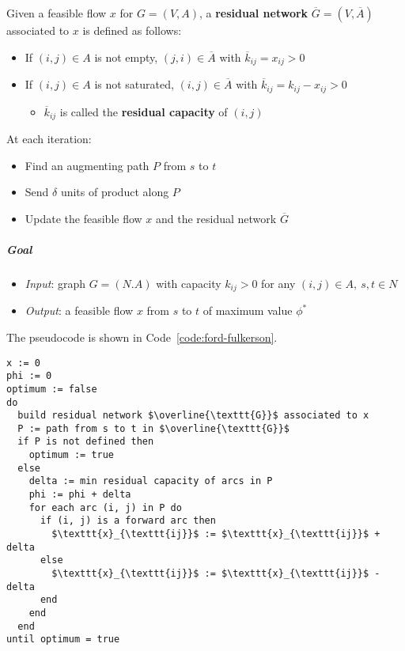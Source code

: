 \documentclass[english]{article}
\begin{document}
\bigskip
Given a feasible flow \(x\) for \(G = (V, A)\), a \textbf{residual network} \(\overline{G} = \left(V, \overline{A}\right)\) associated to \(x\) is defined as follows:

\begin{itemize}
  \item If \(\left( i, j \right) \in A\) is not empty, \(\left( j, i \right) \in \overline{A}\) with \(\overline{k}_{ij} = x_{ij} > 0\)
  \item If \(\left( i, j \right) \in A\) is not saturated, \(\left( i, j \right) \in \overline{A}\) with \(\overline{k}_{ij} = k_{ij} - x_{ij} > 0\)
        \begin{itemize}[label=\(\rightarrow\)]
          \item \(\overline{k}_{ij}\) is called the \textbf{residual capacity} of \(\left( i, j \right)\)
        \end{itemize}
\end{itemize}

At each iteration:

\begin{itemize}
  \item Find an augmenting path \(P\) from \(s\) to \(t\)
  \item Send \(\delta\) units of product along \(P\)
  \item Update the feasible flow \(x\) and the residual network \(\overline{G}\)
\end{itemize}

\subparagraph*{Goal}
\begin{itemize}[label=\(\rightarrow\)]
  \item \textit{Input}: graph \(G = (N. A)\) with capacity \(k_{ij} > 0\) for any \((i, j) \in A, \ s,t \in N\)
  \item \textit{Output}: a feasible flow \(x\) from \(s\) to \(t\) of maximum value \(\phi^\ast\)
\end{itemize}

The pseudocode is shown in Code~\ref{code:ford-fulkerson}.

\begin{lstlisting}[caption={Ford-Fulkerson algorithm}, label={code:ford-fulkerson}]
x := 0
phi := 0
optimum := false
do
  build residual network $\overline{\texttt{G}}$ associated to x
  P := path from s to t in $\overline{\texttt{G}}$
  if P is not defined then
    optimum := true
  else
    delta := min residual capacity of arcs in P
    phi := phi + delta
    for each arc (i, j) in P do
      if (i, j) is a forward arc then
        $\texttt{x}_{\texttt{ij}}$ := $\texttt{x}_{\texttt{ij}}$ + delta
      else
        $\texttt{x}_{\texttt{ij}}$ := $\texttt{x}_{\texttt{ij}}$ - delta
      end
    end
  end
until optimum = true
\end{lstlisting}
\end{document}
